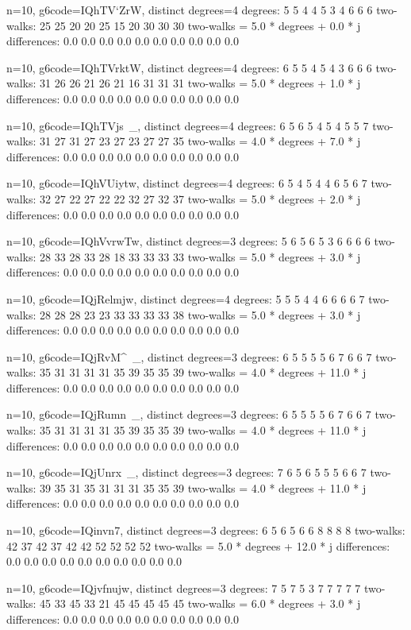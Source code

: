 {{{{{{{{{{{n=10, g6code=IQhTV`ZrW, distinct degrees=4
degrees: 5 5 4 4 5 3 4 6 6 6 
two-walks: 25 25 20 20 25 15 20 30 30 30 
two-walks = 5.0 * degrees + 0.0 * j
differences: 0.0 0.0 0.0 0.0 0.0 0.0 0.0 0.0 0.0 0.0 

n=10, g6code=IQhTVrktW, distinct degrees=4
degrees: 6 5 5 4 5 4 3 6 6 6 
two-walks: 31 26 26 21 26 21 16 31 31 31 
two-walks = 5.0 * degrees + 1.0 * j
differences: 0.0 0.0 0.0 0.0 0.0 0.0 0.0 0.0 0.0 0.0 

n=10, g6code=IQhTVjs~_, distinct degrees=4
degrees: 6 5 6 5 4 5 4 5 5 7 
two-walks: 31 27 31 27 23 27 23 27 27 35 
two-walks = 4.0 * degrees + 7.0 * j
differences: 0.0 0.0 0.0 0.0 0.0 0.0 0.0 0.0 0.0 0.0 

n=10, g6code=IQhVUiytw, distinct degrees=4
degrees: 6 5 4 5 4 4 6 5 6 7 
two-walks: 32 27 22 27 22 22 32 27 32 37 
two-walks = 5.0 * degrees + 2.0 * j
differences: 0.0 0.0 0.0 0.0 0.0 0.0 0.0 0.0 0.0 0.0 

n=10, g6code=IQhVvrwTw, distinct degrees=3
degrees: 5 6 5 6 5 3 6 6 6 6 
two-walks: 28 33 28 33 28 18 33 33 33 33 
two-walks = 5.0 * degrees + 3.0 * j
differences: 0.0 0.0 0.0 0.0 0.0 0.0 0.0 0.0 0.0 0.0 

n=10, g6code=IQjRelmjw, distinct degrees=4
degrees: 5 5 5 4 4 6 6 6 6 7 
two-walks: 28 28 28 23 23 33 33 33 33 38 
two-walks = 5.0 * degrees + 3.0 * j
differences: 0.0 0.0 0.0 0.0 0.0 0.0 0.0 0.0 0.0 0.0 

n=10, g6code=IQjRvM^~_, distinct degrees=3
degrees: 6 5 5 5 5 6 7 6 6 7 
two-walks: 35 31 31 31 31 35 39 35 35 39 
two-walks = 4.0 * degrees + 11.0 * j
differences: 0.0 0.0 0.0 0.0 0.0 0.0 0.0 0.0 0.0 0.0 

n=10, g6code=IQjRumn~_, distinct degrees=3
degrees: 6 5 5 5 5 6 7 6 6 7 
two-walks: 35 31 31 31 31 35 39 35 35 39 
two-walks = 4.0 * degrees + 11.0 * j
differences: 0.0 0.0 0.0 0.0 0.0 0.0 0.0 0.0 0.0 0.0 

n=10, g6code=IQjUnrx~_, distinct degrees=3
degrees: 7 6 5 6 5 5 5 6 6 7 
two-walks: 39 35 31 35 31 31 31 35 35 39 
two-walks = 4.0 * degrees + 11.0 * j
differences: 0.0 0.0 0.0 0.0 0.0 0.0 0.0 0.0 0.0 0.0 

n=10, g6code=IQinvn^^w, distinct degrees=3
degrees: 6 5 6 5 6 6 8 8 8 8 
two-walks: 42 37 42 37 42 42 52 52 52 52 
two-walks = 5.0 * degrees + 12.0 * j
differences: 0.0 0.0 0.0 0.0 0.0 0.0 0.0 0.0 0.0 0.0 

n=10, g6code=IQjvfnujw, distinct degrees=3
degrees: 7 5 7 5 3 7 7 7 7 7 
two-walks: 45 33 45 33 21 45 45 45 45 45 
two-walks = 6.0 * degrees + 3.0 * j
differences: 0.0 0.0 0.0 0.0 0.0 0.0 0.0 0.0 0.0 0.0 

}}}}}}}}}}}
